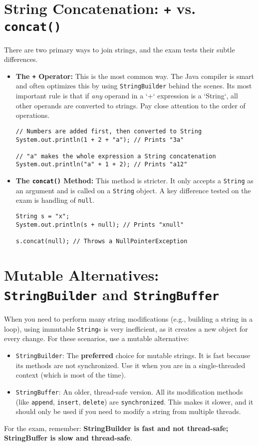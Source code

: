 \documentclass[12pt]{article}
\begin{document}
\begin{enumerate}[label=(\arabic*)]
\section{String Concatenation: \texttt{+} vs. \texttt{concat()}}
There are two primary ways to join strings, and the exam tests their subtle differences.
\begin{itemize}
    \item \textbf{The \texttt{+} Operator:} This is the most common way. The Java compiler is smart and often optimizes this by using \texttt{StringBuilder} behind the scenes. Its most important rule is that if \textit{any} operand in a `+` expression is a `String`, all other operands are converted to strings. Pay close attention to the order of operations.
    \begin{verbatim}
// Numbers are added first, then converted to String
System.out.println(1 + 2 + "a"); // Prints "3a"

// "a" makes the whole expression a String concatenation
System.out.println("a" + 1 + 2); // Prints "a12"
    \end{verbatim}
    \item \textbf{The \texttt{concat()} Method:} This method is stricter. It only accepts a \texttt{String} as an argument and is called on a \texttt{String} object. A key difference tested on the exam is handling of \texttt{null}.
    \begin{verbatim}
String s = "x";
System.out.println(s + null); // Prints "xnull"

s.concat(null); // Throws a NullPointerException
    \end{verbatim}
\end{itemize}

\section{Mutable Alternatives: \texttt{StringBuilder} and \texttt{StringBuffer}}
When you need to perform many string modifications (e.g., building a string in a loop), using immutable \texttt{String}s is very inefficient, as it creates a new object for every change. For these scenarios, use a mutable alternative:
\begin{itemize}
    \item \texttt{StringBuilder}: The \textbf{preferred} choice for mutable strings. It is fast because its methods are not synchronized. Use it when you are in a single-threaded context (which is most of the time).
    \item \texttt{StringBuffer}: An older, thread-safe version. All its modification methods (like \texttt{append}, \texttt{insert}, \texttt{delete}) are \texttt{synchronized}. This makes it slower, and it should only be used if you need to modify a string from multiple threads.
\end{itemize}
For the exam, remember: \textbf{StringBuilder is fast and not thread-safe; StringBuffer is slow and thread-safe}.


\end{enumerate}
\end{document}
